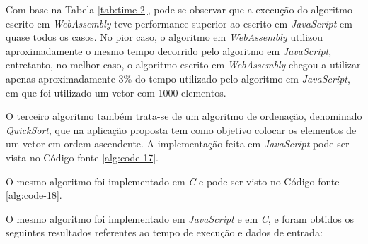 Com base na Tabela \ref{tab:time-2}, pode-se observar que a execução do algoritmo escrito
em \textit{WebAssembly} teve performance superior ao escrito em \textit{JavaScript} em
quase todos os casos. No pior caso, o algoritmo em \textit{WebAssembly} utilizou
aproximadamente o mesmo tempo decorrido pelo algoritmo em \textit{JavaScript}, entretanto,
no melhor caso, o algoritmo escrito em \textit{WebAssembly} chegou a utilizar apenas
aproximadamente 3\% do tempo utilizado pelo algoritmo em \textit{JavaScript}, em que foi
utilizado um vetor com 1000 elementos.

O terceiro algoritmo também trata-se de um algoritmo de ordenação, denominado
\textit{QuickSort}, que na aplicação proposta tem como objetivo colocar os elementos de um
vetor em ordem ascendente. A implementação feita em \textit{JavaScript} pode ser vista no
Código-fonte \ref{alg:code-17}.



O mesmo algoritmo foi implementado em \textit{C} e pode ser visto no Código-fonte
\ref{alg:code-18}.



O mesmo algoritmo foi implementado em \textit{JavaScript} e em \textit{C}, e foram obtidos
os seguintes resultados referentes ao tempo de execução e dados de entrada:

